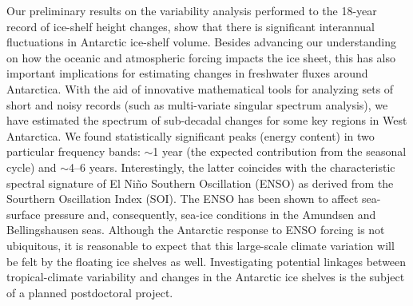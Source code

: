 Our preliminary results on the variability analysis performed to the 18-year record of ice-shelf height changes, show that there is significant interannual fluctuations in Antarctic ice-shelf volume. Besides advancing our understanding on how the oceanic and atmospheric forcing impacts the ice sheet, this has also important implications for estimating changes in freshwater fluxes around Antarctica. With the aid of innovative mathematical tools for analyzing sets of short and noisy records (such as multi-variate singular spectrum analysis), we have estimated the spectrum of sub-decadal changes for some key regions in West Antarctica. We found statistically significant peaks (energy content) in two particular frequency bands: $\sim$1 year (the expected contribution from the seasonal cycle) and $\sim$4--6 years. Interestingly, the latter coincides with the characteristic spectral signature of El Ni\~no Southern Oscillation (ENSO) as derived from the Sourthern Oscillation Index (SOI). The ENSO has been shown to affect sea-surface pressure and, consequently, sea-ice conditions in the Amundsen and Bellingshausen seas. Although the Antarctic response to ENSO forcing is not ubiquitous, it is reasonable to expect that this large-scale climate variation will be felt by the floating ice shelves as well. Investigating potential linkages between tropical-climate variability and changes in the Antarctic ice shelves is the subject of a planned postdoctoral project.
